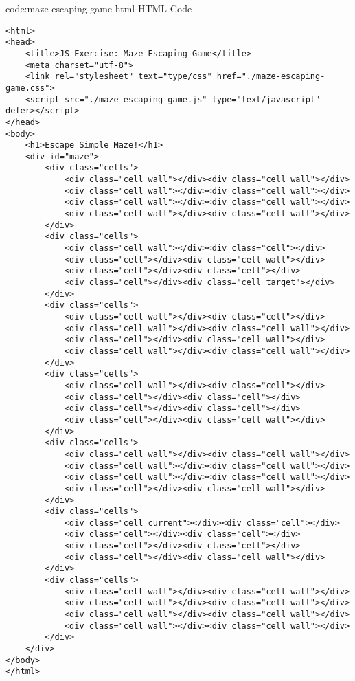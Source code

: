 \begin{codeenv}{code:maze-escaping-game-html}{ HTML Code}
\begin{verbatim}
<html>
<head>
    <title>JS Exercise: Maze Escaping Game</title>
    <meta charset="utf-8">
    <link rel="stylesheet" text="type/css" href="./maze-escaping-game.css">
    <script src="./maze-escaping-game.js" type="text/javascript" defer></script>
</head>
<body>
    <h1>Escape Simple Maze!</h1>
    <div id="maze">
        <div class="cells">
            <div class="cell wall"></div><div class="cell wall"></div>
            <div class="cell wall"></div><div class="cell wall"></div>
            <div class="cell wall"></div><div class="cell wall"></div>
            <div class="cell wall"></div><div class="cell wall"></div>
        </div>
        <div class="cells">
            <div class="cell wall"></div><div class="cell"></div>
            <div class="cell"></div><div class="cell wall"></div>
            <div class="cell"></div><div class="cell"></div>
            <div class="cell"></div><div class="cell target"></div>
        </div>
        <div class="cells">
            <div class="cell wall"></div><div class="cell"></div>
            <div class="cell wall"></div><div class="cell wall"></div>
            <div class="cell"></div><div class="cell wall"></div>
            <div class="cell wall"></div><div class="cell wall"></div>
        </div>
        <div class="cells">
            <div class="cell wall"></div><div class="cell"></div>
            <div class="cell"></div><div class="cell"></div>
            <div class="cell"></div><div class="cell"></div>
            <div class="cell"></div><div class="cell wall"></div>
        </div>
        <div class="cells">
            <div class="cell wall"></div><div class="cell wall"></div>
            <div class="cell wall"></div><div class="cell wall"></div>
            <div class="cell wall"></div><div class="cell wall"></div>
            <div class="cell"></div><div class="cell wall"></div>
        </div>
        <div class="cells">
            <div class="cell current"></div><div class="cell"></div>
            <div class="cell"></div><div class="cell"></div>
            <div class="cell"></div><div class="cell"></div>
            <div class="cell"></div><div class="cell wall"></div>
        </div>
        <div class="cells">
            <div class="cell wall"></div><div class="cell wall"></div>
            <div class="cell wall"></div><div class="cell wall"></div>
            <div class="cell wall"></div><div class="cell wall"></div>
            <div class="cell wall"></div><div class="cell wall"></div>
        </div>
    </div>
</body>
</html>
\end{verbatim}
\end{codeenv}
